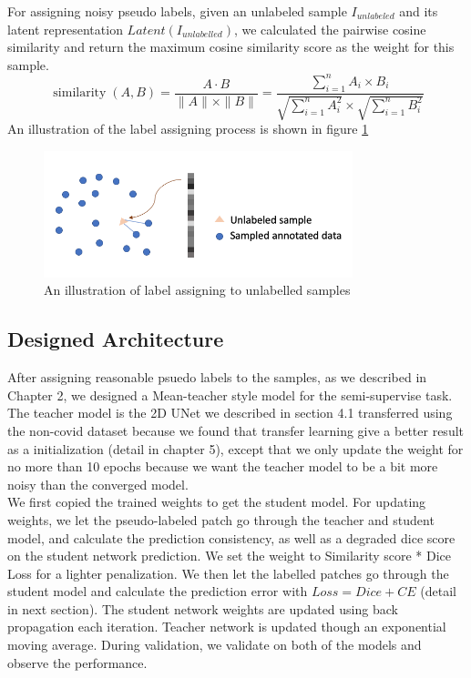 For assigning noisy pseudo labels, given an unlabeled sample $I_{unlabeled}$ and its latent representation $Latent(I_{unlabelled})$, we calculated the pairwise cosine similarity and return the maximum cosine similarity score as the weight for this sample. 
$$\operatorname{similarity}(A, B)=\frac{A \cdot B}{\|A\| \times\|B\|}=\frac{\sum_{i=1}^{n} A_{i} \times B_{i}}{\sqrt{\sum_{i=1}^{n} A_{i}^{2}} \times \sqrt{\sum_{i=1}^{n} B_{i}^{2}}}$$
An illustration of the label assigning process is shown in figure \ref{fig:semi-label-assign}\\

\begin{figure}
	\centering
	\includegraphics[width=0.8\textwidth]{img/semi-experiment/semi-label-assign}
	\caption{An illustration of label assigning to unlabelled samples}
	\label{fig:semi-label-assign}
\end{figure}

\subsection{Designed Architecture}
After assigning reasonable psuedo labels to the samples, as we described in Chapter 2, we designed a Mean-teacher style model for the semi-supervise task.\\

The teacher model is the 2D UNet we described in section 4.1 transferred using the non-covid dataset because we found that transfer learning give a better result as a initialization (detail in chapter 5), except that we only update the weight for no more than 10 epochs because we want the teacher model to be a bit more noisy than the converged model.\\

We first copied the trained weights to get the student model. 
For updating weights, we let the pseudo-labeled patch go through the teacher and student model, and calculate the prediction consistency, as well as a degraded dice score on the student network prediction. We set the weight to  Similarity score * Dice Loss for a lighter penalization. We then let the labelled patches go through the student model and calculate the prediction error with $Loss = Dice + CE$ (detail in next section). The student network weights are updated using back propagation each iteration. Teacher network is updated though an exponential moving average. During validation, we validate on both of the models and observe the performance.                    

